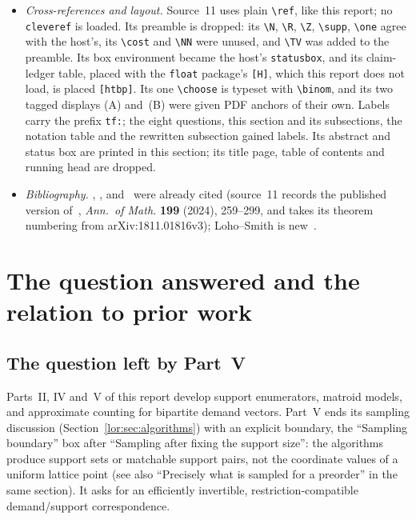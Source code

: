 \documentclass[11pt]{article}
\numberwithin{equation}{section}
\theoremstyle{definition}
\newcommand{\R}{\mathbb R}
\newcommand{\Z}{\mathbb Z}
\newcommand{\N}{\mathbb Z_{\geq0}}
\newcommand{\supp}{\operatorname{supp}}
\newcommand{\one}{\mathbf 1}
\newcommand{\TV}{\operatorname{TV}}
\begin{document}
\begin{itemize}[leftmargin=1.4em]
expanded. Its code, data and audit files keep their delivered base names
behind the prefix \texttt{11-two-flow-}: \texttt{transport\_bijection.py},
\texttt{verify.py} and \texttt{build.sh} in \nolinkurl{code/}; the six
suite records \texttt{small.json}, \texttt{four\_by\_three.json},
\texttt{preorders.json}, \texttt{random.json}, \texttt{chain.json},
\texttt{example.json}, and \texttt{environment.json} and
\texttt{verification\_run.txt}, in \nolinkurl{data/}; and
\texttt{PROOF\_STATUS.md}, \texttt{SOURCE\_AUDIT.md} at the report root.
Merge notes give the shipped names; its two code listings are kept with
delivery names.
\item \emph{Cross-references and layout.} Source~11 uses plain
\verb|\ref|, like this report; no \texttt{cleveref} is loaded. Its
preamble is dropped: its \verb|\N|, \verb|\R|, \verb|\Z|, \verb|\supp|,
\verb|\one| agree with the host's, its \verb|\cost| and \verb|\NN| were
unused, and \verb|\TV| was added to the preamble. Its box environment
became the host's \texttt{statusbox}, and its claim-ledger table, placed
with the \texttt{float} package's \texttt{[H]}, which this report does not
load, is placed \texttt{[htbp]}. Its one \verb|\choose| is typeset with
\verb|\binom|, and its two tagged displays (A) and~(B) were given PDF
anchors of their own. Labels carry the prefix \texttt{tf:}; the
eight questions, this section and its subsections, the notation table and
the rewritten subsection gained labels. Its abstract and status box are
printed in this section; its title page, table of contents and running
head are dropped.
\item \emph{Bibliography.} \cite{Oh}, \cite{OT20}, \cite{ALOV}
and~\cite{AC} were already cited (source~11 records the published version
of~\cite{ALOV}, \emph{Ann.\ of Math.} \textbf{199} (2024), 259--299, and
takes its theorem numbering from arXiv:1811.01816v3); Loho--Smith is
new~\cite{LohoSmith}.
\end{itemize}

\section{The question answered and the relation to prior work}
\label{tf:sec:target}

\subsection{The question left by Part~V}
\label{tf:sec:gap}
Parts~II, IV and~V of this report develop support enumerators, matroid
models, and approximate counting for bipartite demand vectors. Part~V
ends its sampling discussion (Section~\ref{lor:sec:algorithms}) with an
explicit boundary, the ``Sampling boundary'' box after ``Sampling after
fixing the support size'': the algorithms produce support sets or
matchable support pairs, not the coordinate values of a uniform lattice
point (see also ``Precisely what is sampled for a preorder'' in the same
section). It asks for an efficiently invertible, restriction-compatible
demand/support correspondence.
\end{document}
